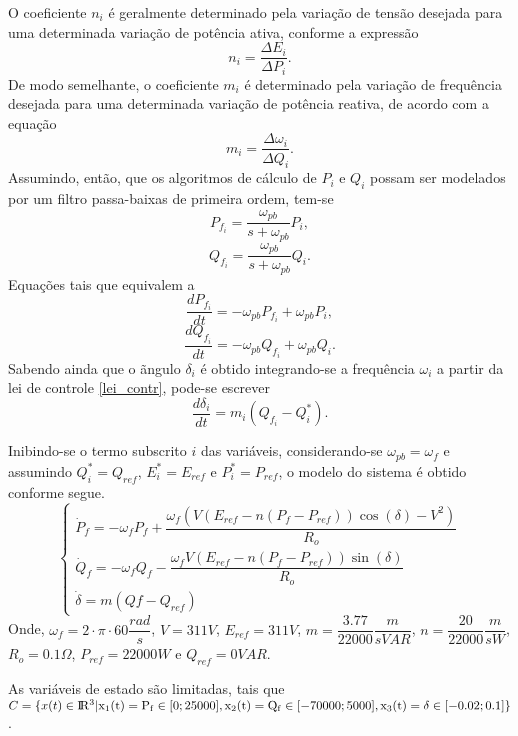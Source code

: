 \begin{example} 
O coeficiente $n_i$ é geralmente determinado pela variação de tensão desejada para uma determinada variação de potência ativa, conforme a expressão
\begin{equation}
n_i = \dfrac{\Delta E_i}{\Delta P_i}.
\end{equation}
De modo semelhante, o coeficiente $m_i$ é determinado pela variação de frequência desejada para uma determinada variação de potência reativa, de acordo com a equação
\begin{equation}
m_i = \dfrac{\Delta \omega_i}{\Delta Q_i}.
\end{equation}
Assumindo, então, que os algoritmos de cálculo de $P_i$ e $Q_i$ possam ser modelados por um filtro passa-baixas de primeira ordem, tem-se
\begin{equation}
P_{f_i} = \dfrac{\omega_{pb}}{s+\omega_{pb}}P_i,
\end{equation}
\begin{equation}
Q_{f_i} = \dfrac{\omega_{pb}}{s+\omega_{pb}}Q_i.
\end{equation}
Equações tais que equivalem a
\begin{equation}
\dfrac{dP_{f_i}}{dt} = -\omega_{pb}P_{f_i}+\omega_{pb}P_i,
\end{equation}
\begin{equation}
\dfrac{dQ_{f_i}}{dt} = -\omega_{pb}Q_{f_i}+\omega_{pb}Q_i.
\end{equation}
Sabendo ainda que o ãngulo $\delta_i$ é obtido integrando-se a frequência $\omega_i$ a partir da lei de controle \ref{lei_contr}, pode-se escrever
\begin{equation}
\dfrac{d\delta_i}{dt} = m_i(Q_{f_i} - Q_i^*).
\end{equation}

Inibindo-se o termo subscrito $i$ das variáveis, considerando-se $\omega_{pb} = \omega_f$ e assumindo $Q_i^* = Q_{ref}$, $E_i^* = E_{ref}$ e $P_i^* = P_{ref}$, o modelo do sistema é obtido conforme segue.
\begin{equation} \label{eq:sist_droop}
\begin{cases}\dot{P}_f = -\omega_f P_f+\dfrac{\omega_f(V(E_{ref}-n(P_f-P_{ref}))\cos(\delta)-V^2)}{R_o}\\
\dot{Q}_f=
-\omega_f Q_f-
\dfrac{\omega_f V(E_{ref}-n(P_f - P_{ref}))\sin(\delta)}
{R_o}\\
\dot{\delta}=m(Qf-Q_{ref})\end{cases}
\end{equation}
Onde, $\omega_ f = 2\cdot\pi\cdot60 \dfrac{rad}{s}$, 
$V = 311 V$, 
$E_{ref} = 311 V$, 
$m = \dfrac{3.77}{22000} \dfrac{m}{s VAR}$, 
$n = \dfrac{20}{22000} \dfrac{m}{s W}$, 
$R_o = 0.1 \Omega$, 
$P_{ref} = 22000 W$ e 
$Q_{ref} = 0 VAR$.

As variáveis de estado são limitadas, tais que $C = \{x(t) \in \rm I\!R^3 | x_1(t) = P_f \in [0; 25000], x_2(t) = Q_f \in [-70000; 5000], x_3(t) = \delta \in [-0.02; 0.1]\}$.
\end{example}\label{ex:droop_UFSM}

